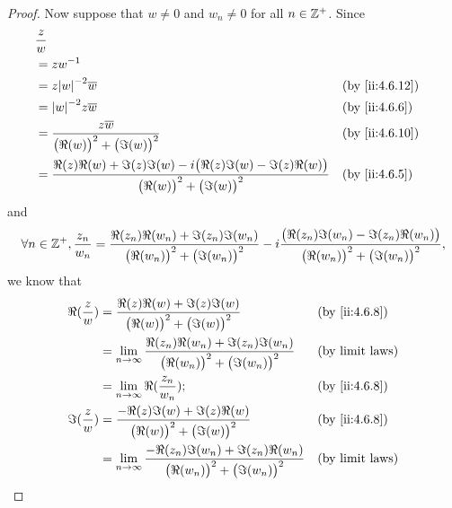 \begin{proof}
  Now suppose that \(w \neq 0\) and \(w_n \neq 0\) for all \(n \in \mathbb{Z}^+\).
  Since
  \begin{align*}
     & \dfrac{z}{w}                                                                                                                                     \\
     & = z w^{-1}                                                                                                                                       \\
     & = z \abs{w}^{-2} \overline{w}                                                                                                &  & \by{ii:4.6.12} \\
     & = \abs{w}^{-2} z \overline{w}                                                                                                &  & \by{ii:4.6.6}  \\
     & = \dfrac{z \overline{w}}{\big(\Re(w)\big)^2 + \big(\Im(w)\big)^2}                                                            &  & \by{ii:4.6.10} \\
     & = \dfrac{\Re(z) \Re(w) + \Im(z) \Im(w) - i \big(\Re(z) \Im(w) - \Im(z) \Re(w)\big)}{\big(\Re(w)\big)^2 + \big(\Im(w)\big)^2} &  & \by{ii:4.6.5}
  \end{align*}
  and
  \[
    \forall n \in \mathbb{Z}^+, \dfrac{z_n}{w_n} = \dfrac{\Re(z_n) \Re(w_n) + \Im(z_n) \Im(w_n)}{\big(\Re(w_n)\big)^2 + \big(\Im(w_n)\big)^2} - i \dfrac{\big(\Re(z_n) \Im(w_n) - \Im(z_n) \Re(w_n)\big)}{\big(\Re(w_n)\big)^2 + \big(\Im(w_n)\big)^2},
  \]
  we know that
  \begin{align*}
    \Re(\dfrac{z}{w}) & = \dfrac{\Re(z) \Re(w) + \Im(z) \Im(w)}{\big(\Re(w)\big)^2 + \big(\Im(w)\big)^2}                                   &  & \by{ii:4.6.8}          \\
                      & = \lim_{n \to \infty} \dfrac{\Re(z_n) \Re(w_n) + \Im(z_n) \Im(w_n)}{\big(\Re(w_n)\big)^2 + \big(\Im(w_n)\big)^2}   &  & \text{(by limit laws)} \\
                      & = \lim_{n \to \infty} \Re(\dfrac{z_n}{w_n});                                                                       &  & \by{ii:4.6.8}          \\
    \Im(\dfrac{z}{w}) & = \dfrac{- \Re(z) \Im(w) + \Im(z) \Re(w)}{\big(\Re(w)\big)^2 + \big(\Im(w)\big)^2}                                 &  & \by{ii:4.6.8}          \\
                      & = \lim_{n \to \infty} \dfrac{- \Re(z_n) \Im(w_n) + \Im(z_n) \Re(w_n)}{\big(\Re(w_n)\big)^2 + \big(\Im(w_n)\big)^2} &  & \text{(by limit laws)} \\

\end{align*}
\end{proof}
